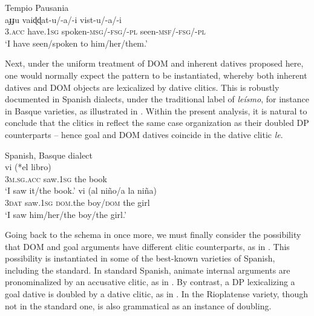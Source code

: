 \documentclass[output=paper,colorlinks,citecolor=brown]{./langscibook}
\begin{document}
\ea%
    \label{ex:manzini:22}
    Tempio Pausania \citep{ManziniSavoia2005}\\
        {aɟɟu}     {vaiɖɖat-u/-a/-i}    {vist-u/-a/-i}\\
        \textsc{3.acc}  have.\textsc{1sg}   spoken-\textsc{msg/-fsg/-pl} seen-\textsc{msf/-fsg/-pl}\\
    \glt ‘I have seen/spoken to him/her/them.’
\z


Next, under the uniform treatment of DOM and inherent datives proposed here, one would normally expect the pattern  to be instantiated, whereby both inherent datives and DOM objects are lexicalized by dative clitics. This is robustly documented in Spanish dialects, under the traditional label of \textit{leísmo}, for instance in Basque varieties, as illustrated in .  Within the present analysis, it is natural to conclude that the clitics in  reflect the same case organization as their doubled DP counterparts – hence goal and DOM datives coincide in the dative clitic \textit{le}. 

\ea%
    \label{ex:manzini:23}
    Spanish, Basque dialect \citep{OrmazabalRomero2013Probus}\\
    \ea\label{ex:manzini:23a}      {vi}     (*el libro)\\
        \textsc{3m.sg.acc}  saw.\textsc{1sg}  {\db}the book\\
    \glt ‘I saw it/the book.’
    \ex\label{ex:manzini:23b}    {vi}     (al niño/a la niña)\\
        \textsc{3dat}  saw.\textsc{1sg}  \textsc{dom}.the boy/\textsc{dom} the girl\\
    \glt ‘I saw him/her/the boy/the girl.’
    \z
\z

Going back to the schema in  once more, we must finally consider the possibility that DOM and goal arguments have different clitic counterparts, as in . This possibility is instantiated in some of the best-known varieties of Spanish, including the standard. In standard Spanish, animate internal arguments are pronominalized by an accusative clitic, as in . By contrast, a DP lexicalizing a goal dative is doubled by a dative clitic, as in . In the Rioplatense variety, though not in the standard one,  is also grammatical as an instance of doubling.
\end{document}
